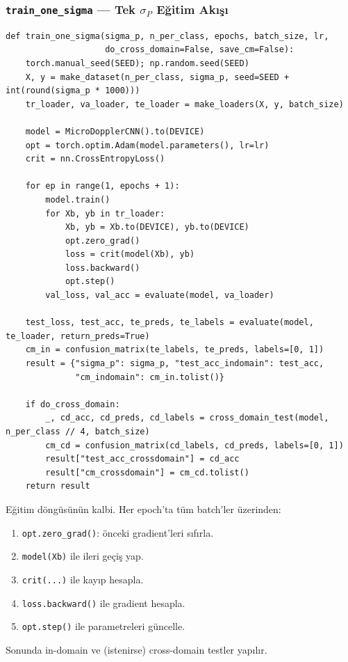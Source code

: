 \documentclass[11pt,a4paper]{article}
\begin{document}
\subsubsection{\texttt{train\_one\_sigma} — Tek $\sigma_P$ Eğitim Akışı}
\begin{lstlisting}
def train_one_sigma(sigma_p, n_per_class, epochs, batch_size, lr,
                    do_cross_domain=False, save_cm=False):
    torch.manual_seed(SEED); np.random.seed(SEED)
    X, y = make_dataset(n_per_class, sigma_p, seed=SEED + int(round(sigma_p * 1000)))
    tr_loader, va_loader, te_loader = make_loaders(X, y, batch_size)

    model = MicroDopplerCNN().to(DEVICE)
    opt = torch.optim.Adam(model.parameters(), lr=lr)
    crit = nn.CrossEntropyLoss()

    for ep in range(1, epochs + 1):
        model.train()
        for Xb, yb in tr_loader:
            Xb, yb = Xb.to(DEVICE), yb.to(DEVICE)
            opt.zero_grad()
            loss = crit(model(Xb), yb)
            loss.backward()
            opt.step()
        val_loss, val_acc = evaluate(model, va_loader)

    test_loss, test_acc, te_preds, te_labels = evaluate(model, te_loader, return_preds=True)
    cm_in = confusion_matrix(te_labels, te_preds, labels=[0, 1])
    result = {"sigma_p": sigma_p, "test_acc_indomain": test_acc,
              "cm_indomain": cm_in.tolist()}

    if do_cross_domain:
        _, cd_acc, cd_preds, cd_labels = cross_domain_test(model, n_per_class // 4, batch_size)
        cm_cd = confusion_matrix(cd_labels, cd_preds, labels=[0, 1])
        result["test_acc_crossdomain"] = cd_acc
        result["cm_crossdomain"] = cm_cd.tolist()
    return result
\end{lstlisting}
Eğitim döngüsünün kalbi. Her epoch'ta tüm batch'ler üzerinden:
\begin{enumerate}
    \item \texttt{opt.zero\_grad()}: önceki gradient'leri sıfırla.
    \item \texttt{model(Xb)} ile ileri geçiş yap.
    \item \texttt{crit(...)} ile kayıp hesapla.
    \item \texttt{loss.backward()} ile gradient hesapla.
    \item \texttt{opt.step()} ile parametreleri güncelle.
\end{enumerate}
Sonunda in-domain ve (istenirse) cross-domain testler yapılır.
\end{document}
